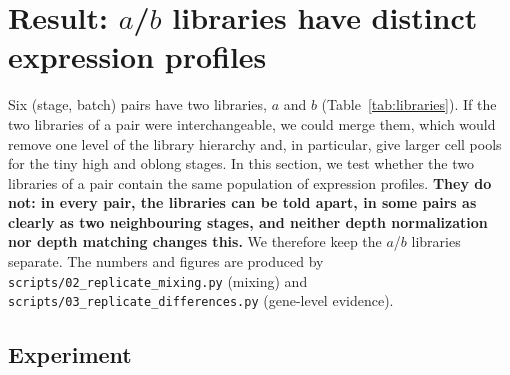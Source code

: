 \documentclass[11pt,a4paper]{article}
\begin{document}
\section{Result: \texorpdfstring{$a$/$b$}{a/b} libraries have distinct expression profiles}
\label{sec:replicates}

Six (stage, batch) pairs have two libraries, $a$ and $b$ (Table~\ref{tab:libraries}). If the two libraries of a pair were interchangeable, we could merge them, which would remove one level of the library hierarchy and, in particular, give larger cell pools for the tiny high and oblong stages. In this section, we test whether the two libraries of a pair contain the same population of expression profiles. \textbf{They do not: in every pair, the libraries can be told apart, in some pairs as clearly as two neighbouring stages, and neither depth normalization nor depth matching changes this.} We therefore keep the $a$/$b$ libraries separate. The numbers and figures are produced by \nolinkurl{scripts/02_replicate_mixing.py} (mixing) and \nolinkurl{scripts/03_replicate_differences.py} (gene-level evidence).

\subsection{Experiment}
\end{document}
